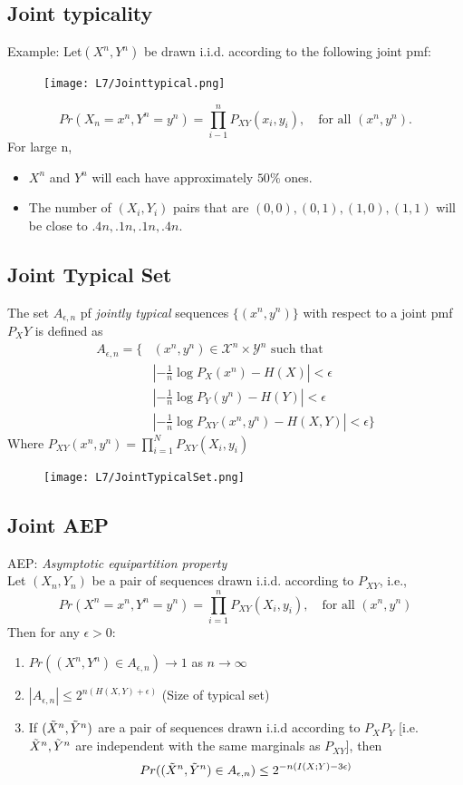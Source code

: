 \documentclass[12pt]{article}
\begin{document}
\subsection{Joint typicality}
Example: Let$(X^n,Y^n)$ be drawn i.i.d. according to the following joint pmf: 
\begin{figure}[H]
    \centering
    \texttt{[image: L7/Jointtypical.png]}
\end{figure}
\[
Pr(X_n = x^n, Y^n = y^n) = \prod_{i-1}^n P_{XY}(x_i,y_i), \quad \textrm{for all }(x^n,y^n).
\]
For large n,
\begin{itemize}
    \item $X^n$ and $Y^n$ will each have approximately $50\%$ ones.
    \item The number of $(X_i,Y_i)$ pairs that are $(0,0),(0,1),(1,0),(1,1)$ will be close to $.4n,.1n,.1n,.4n$.
\end{itemize}

\subsection{Joint Typical Set}
The set $A_{\epsilon,n}$ pf \textcolor{blue1}{\textit{jointly typical}} sequences $\{ (x^n, y^n)\}$ with respect to a joint pmf $P_XY$ is defined as 
\begin{align*}
    A_{\epsilon,n} = \{ &(x^n, y^n) \in \mathcal{X}^n \times \mathcal{Y}^n \textrm{ such that} \\  
    &|- \frac{1}{n} \log P_X(x^n)-H(X)| < \epsilon\\
    &|- \frac{1}{n} \log P_Y(y^n)-H(Y)| < \epsilon\\
    &|- \frac{1}{n} \log P_{XY}(x^n,y^n)-H(X,Y)| < \epsilon \}
\end{align*}
Where $P_{XY}(x^n,y^n) = \prod_{i=1}^N P_{XY}(X_i,y_i)$

\begin{figure}[H]
    \centering
    \texttt{[image: L7/JointTypicalSet.png]}
\end{figure}

\subsection{Joint AEP}
{\large{AEP: \textit{Asymptotic equipartition property}}}\\
Let $(X_n,Y_n)$ be a pair of sequences drawn i.i.d. according to $P_{XY}$, i.e.,
\[
Pr(X^n=x^n,Y^n=y^n) = \prod_{i=1}^n P_{XY}(X_i,y_i), \quad \textrm{for all }(x^n,y^n)
\]
Then for any $\epsilon > 0$:
\begin{enumerate}
    \item $Pr((X^n,Y^n)\in A_{\epsilon ,n}) \rightarrow 1$ as $n\rightarrow \infty$
    \item $|A_{\epsilon , n}| \le 2^{n(H(X,Y)+\epsilon)}$  (Size of typical set)
    \item If $(\Tilde{X}^n,\Tilde{Y}^n)$ are a pair of sequences drawn i.i.d according to $P_X P_Y$ [i.e. $\Tilde{X}^n,\Tilde{Y}^n$ are independent with the same marginals as $P_{XY}$], then 
    \[
    Pr((\Tilde{X}^n,\Tilde{Y}^n)\in A_{\epsilon ,n}) \le 2^{-n(I(X;Y)-3\epsilon)}
    \]
\end{enumerate}
\end{document}
